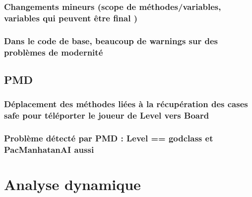 \documentclass[12pt, openany]{report}
\begin{document}
\subsubsection{Changements mineurs (\og scope \fg de méthodes/variables, variables qui peuvent être \og final \fg)}
\subsubsection{Dans le code de base, beaucoup de \og warnings \fg sur des \og problèmes de modernité \fg}

\subsection{PMD}
\subsubsection{Déplacement des méthodes liées à la récupération des cases \og safe \fg pour téléporter le joueur de Level vers Board}
\subsubsection{Problème détecté par PMD : Level == godclass et PacManhatanAI aussi}
\section{Analyse dynamique}
\end{document}
